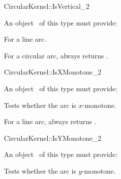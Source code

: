 \begin{ccRefFunctionObjectConcept}{CircularKernel::IsVertical_2}


An object \ccVar\ of this type must provide:

{For a line arc.}

{For a circular arc,  always returns .}

\ccHasModels


\ccSeeAlso


\end{ccRefFunctionObjectConcept}

\begin{ccRefFunctionObjectConcept}{CircularKernel::IsXMonotone_2}


An object \ccVar\ of this type must provide:

{Tests whether the arc is $x$-monotone.}

{For a line arc, always returns .}

\ccHasModels


\ccSeeAlso


\end{ccRefFunctionObjectConcept}

\begin{ccRefFunctionObjectConcept}{CircularKernel::IsYMonotone_2}


An object \ccVar\ of this type must provide:

{Tests whether the arc is $y$-monotone.}

\ccHasModels


\ccSeeAlso


\end{ccRefFunctionObjectConcept}

